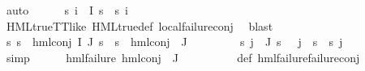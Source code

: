 \begin{isabellebody}
\ auto\isanewline
\ \ \ \ \isamarkupfalse%
\ {\isachardoublequoteopen}{\isasymforall}s{\isachardot}{\kern0pt}\ {\isasymforall}i\ {\isasymin}\ I{\isachardot}{\kern0pt}\ s\ {\isasymTurnstile}\ {\isasympsi}s\ i{\isachardoublequoteclose}\ \isanewline
\ \ \ \ \ \ \isamarkupfalse%
\ HML{\isacharunderscore}{\kern0pt}true{\isacharunderscore}{\kern0pt}TT{\isacharunderscore}{\kern0pt}like\ HML{\isacharunderscore}{\kern0pt}true{\isacharunderscore}{\kern0pt}def\ local{\isachardot}{\kern0pt}failure{\isacharunderscore}{\kern0pt}conj\ \isamarkupfalse%
\ blast\isanewline
\ \ \ \ \isamarkupfalse%
\ {\isachardoublequoteopen}{\isacharparenleft}{\kern0pt}{\isasymforall}s{\isachardot}{\kern0pt}\ {\isacharparenleft}{\kern0pt}s\ {\isasymTurnstile}\ hml{\isacharunderscore}{\kern0pt}conj\ I\ J\ {\isasympsi}s{\isacharparenright}{\kern0pt}\ {\isacharequal}{\kern0pt}\ {\isacharparenleft}{\kern0pt}s\ {\isasymTurnstile}\ {\isacharparenleft}{\kern0pt}hml{\isacharunderscore}{\kern0pt}conj\ {\isacharbraceleft}{\kern0pt}{\isacharbraceright}{\kern0pt}\ J\ {\isasymPsi}{\isacharparenright}{\kern0pt}{\isacharparenright}{\kern0pt}{\isacharparenright}{\kern0pt}{\isachardoublequoteclose}\isanewline
\ \ \ \ \ \ \isamarkupfalse%
\ {\isacartoucheopen}{\isacharparenleft}{\kern0pt}{\isasymforall}s{\isachardot}{\kern0pt}\ {\isasymforall}j\ {\isasymin}\ J{\isachardot}{\kern0pt}\ {\isacharparenleft}{\kern0pt}{\isasymnot}{\isacharparenleft}{\kern0pt}s\ {\isasymTurnstile}\ {\isacharparenleft}{\kern0pt}{\isasymPsi}\ j{\isacharparenright}{\kern0pt}{\isacharparenright}{\kern0pt}\ {\isacharequal}{\kern0pt}\ {\isacharparenleft}{\kern0pt}{\isasymnot}{\isacharparenleft}{\kern0pt}s\ {\isasymTurnstile}\ {\isacharparenleft}{\kern0pt}{\isasympsi}s\ j{\isacharparenright}{\kern0pt}{\isacharparenright}{\kern0pt}{\isacharparenright}{\kern0pt}{\isacharparenright}{\kern0pt}{\isacharparenright}{\kern0pt}{\isacartoucheclose}\isanewline
\ \ \ \ \ \ \isamarkupfalse%
\ simp\isanewline
\ \ \ \ \isamarkupfalse%
\ {\isachardoublequoteopen}hml{\isacharunderscore}{\kern0pt}failure\ {\isacharparenleft}{\kern0pt}hml{\isacharunderscore}{\kern0pt}conj\ {\isacharbraceleft}{\kern0pt}{\isacharbraceright}{\kern0pt}\ J\ {\isasymPsi}{\isacharparenright}{\kern0pt}{\isachardoublequoteclose}\ \isanewline
\ \ \ \ \ \ \isamarkupfalse%
\ {\isasymPsi}{\isacharunderscore}{\kern0pt}def\ hml{\isacharunderscore}{\kern0pt}failure{\isachardot}{\kern0pt}failure{\isacharunderscore}{\kern0pt}conj\isanewline
\ \ \ \ \ \ \isamarkupfalse%

\end{isabellebody}
